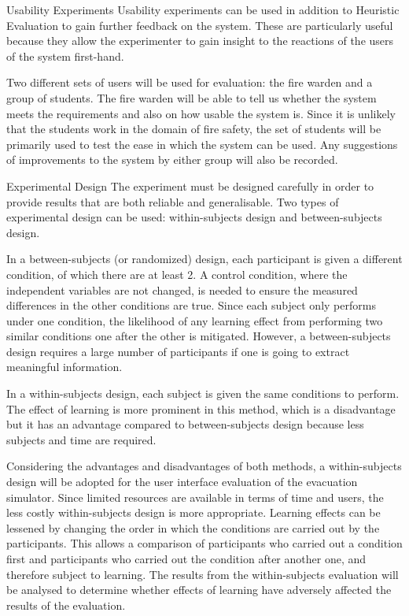 \documentclass{article}
\begin{document}
Usability Experiments
Usability experiments can be used in addition to Heuristic Evaluation to gain further feedback on the system. These are particularly useful because they allow the experimenter to gain insight to the reactions of the users of the system first-hand.

Two different sets of users will be used for evaluation: the fire warden and a group of students. The fire warden will be able to tell us whether the system meets the requirements and also on how usable the system is. Since it is unlikely that the students work in the domain of fire safety, the set of students will be primarily used to test the ease in which the system can be used. Any suggestions of improvements to the system by either group will also be recorded.

Experimental Design
The experiment must be designed carefully in order to provide results that are both reliable and generalisable. Two types of experimental design can be used: within-subjects design and between-subjects design.

In a between-subjects (or randomized) design, each participant is given a different condition, of which there are at least 2. A control condition, where the independent variables are not changed, is needed to ensure the measured differences in the other conditions are true. Since each subject only performs under one condition, the likelihood of any learning effect from performing two similar conditions one after the other is mitigated. However, a between-subjects design requires a large number of participants if one is going to extract meaningful information.

In a within-subjects design, each subject is given the same conditions to perform. The effect of learning is more prominent in this method, which is a disadvantage but it has an advantage compared to between-subjects design because less subjects and time are required.

Considering the advantages and disadvantages of both methods, a within-subjects design will be adopted for the user interface evaluation of the evacuation simulator. Since limited resources are available in terms of time and users, the less costly within-subjects design is more appropriate. Learning effects can be lessened by changing the order in which the conditions are carried out by the participants. This allows a comparison of participants who carried out a condition first and participants who carried out the condition after another one, and therefore subject to learning. The results from the within-subjects evaluation will be analysed to determine whether effects of learning have adversely affected the results of the evaluation.
\end{document}

